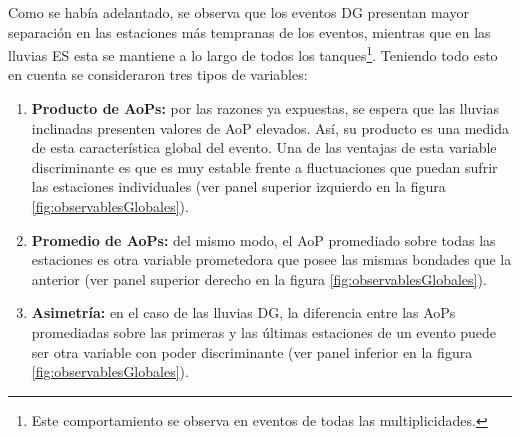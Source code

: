 	Como se hab\'ia adelantado, se observa que los eventos DG presentan mayor separación en las estaciones más tempranas de los eventos, mientras que en las lluvias ES esta se mantiene a lo largo de todos los tanques\footnote{Este comportamiento se observa en eventos de todas las multiplicidades.}. 	
	Teniendo todo esto en cuenta se consideraron tres tipos de variables:
	\begin{enumerate}
	 \item \textbf{Producto de AoPs:} por las razones ya expuestas, se espera que las lluvias inclinadas presenten valores de AoP elevados. Así, su producto es una medida de esta característica global del evento. Una de las ventajas de esta variable discriminante es que es muy estable frente a fluctuaciones que puedan sufrir las estaciones individuales (ver panel superior izquierdo en la figura \ref{fig:observablesGlobales}). 
	 \item \textbf{Promedio de AoPs:} del mismo modo, el AoP promediado sobre todas las estaciones es otra variable prometedora que posee las mismas bondades que la anterior (ver panel superior derecho en la figura \ref{fig:observablesGlobales}).
	 \item \textbf{Asimetría:} en el caso de las lluvias DG, la diferencia entre las AoPs promediadas sobre las primeras  y las últimas estaciones de un evento puede ser otra variable con poder discriminante (ver panel inferior en la figura \ref{fig:observablesGlobales}). 
	\end{enumerate}
